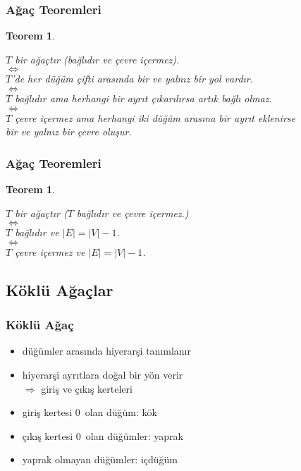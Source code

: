 \documentclass[dvipsnames]{beamer}
\theoremstyle{definition}
\theoremstyle{example}
\theoremstyle{plain}
\newtheorem{teorem}[theorem]{Teorem}
\begin{document}
\begin{frame}
  \frametitle{Ağaç Teoremleri}

  \begin{teorem}
    \begin{center}
      $T$ bir ağaçtır (bağlıdır ve çevre içermez).\\
      $\Leftrightarrow$\\
      $T$'de her düğüm çifti arasında bir ve yalnız bir yol vardır.\\
      $\Leftrightarrow$\\
      $T$ bağlıdır ama herhangi bir ayrıt çıkarılırsa artık bağlı olmaz.\\
      $\Leftrightarrow$\\
      $T$ çevre içermez ama herhangi iki düğüm arasına bir ayrıt eklenirse\\
        bir ve yalnız bir çevre oluşur.
    \end{center}
  \end{teorem}
\end{frame}

\begin{frame}
  \frametitle{Ağaç Teoremleri}

  \begin{teorem}
    \begin{center}
      $T$ bir ağaçtır ($T$ bağlıdır ve çevre içermez.)\\
      $\Leftrightarrow$\\
      $T$ bağlıdır ve $|E| = |V| - 1$.\\
      $\Leftrightarrow$\\
      $T$ çevre içermez ve $|E| = |V| - 1$.
    \end{center}
  \end{teorem}
\end{frame}

\subsection{Köklü Ağaçlar}

\begin{frame}
  \frametitle{Köklü Ağaç}

  \begin{itemize}
    \item düğümler arasında hiyerarşi tanımlanır
    \item hiyerarşi ayrıtlara doğal bir yön verir\\
      $\Rightarrow$ giriş ve çıkış kerteleri

    \pause
    \medskip
    \item giriş kertesi 0~olan düğüm: \alert{kök}
    \item çıkış kertesi 0~olan düğümler: \alert{yaprak}
    \item yaprak olmayan düğümler: \alert{içdüğüm}
  \end{itemize}
\end{frame}
\end{document}
